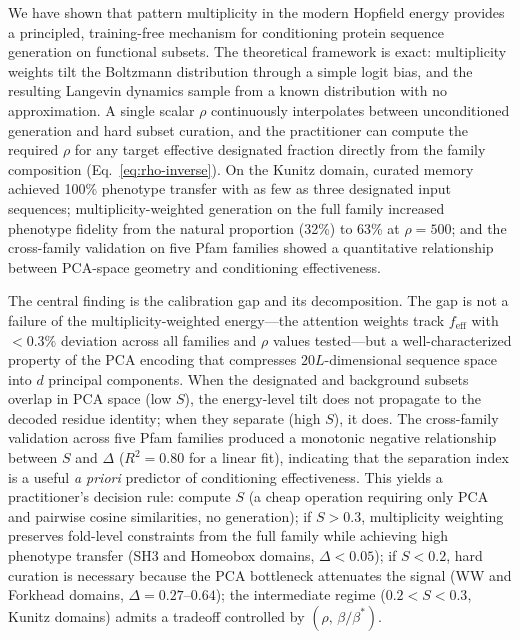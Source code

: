 We have shown that pattern multiplicity in the modern Hopfield energy provides a principled,
training-free mechanism for conditioning protein sequence generation on functional subsets. The
theoretical framework is exact: multiplicity weights tilt the Boltzmann distribution through a
simple logit bias, and the resulting Langevin dynamics sample from a known distribution with no
approximation. A single scalar $\rho$ continuously interpolates between unconditioned generation
and hard subset curation, and the practitioner can compute the required $\rho$ for any target
effective designated fraction directly from the family composition (Eq.~\ref{eq:rho-inverse}). On
the Kunitz domain, curated memory achieved 100\% phenotype transfer with as few as three
designated input sequences; multiplicity-weighted generation on the full family increased
phenotype fidelity from the natural proportion (32\%) to 63\% at $\rho = 500$; and the
cross-family validation on five Pfam families showed a quantitative relationship between
PCA-space geometry and conditioning effectiveness.

The central finding is the calibration gap and its decomposition. The gap is not a
failure of the multiplicity-weighted energy---the attention weights track $f_{\mathrm{eff}}$ with
$< 0.3\%$ deviation across all families and $\rho$ values tested---but a well-characterized
property of the PCA encoding that compresses $20L$-dimensional sequence space into $d$ principal
components. When the designated and background subsets overlap in PCA space (low $S$), the
energy-level tilt does not propagate to the decoded residue identity; when they separate
(high $S$), it does. The cross-family validation across five Pfam families produced a monotonic
negative relationship between $S$ and $\Delta$ ($R^{2} = 0.80$ for a linear fit), indicating
that the separation index is a useful \emph{a priori} predictor of conditioning effectiveness.
This yields a practitioner's decision rule: compute $S$ (a cheap operation requiring only PCA and
pairwise cosine similarities, no generation); if $S > 0.3$, multiplicity weighting preserves
fold-level constraints from the full family while achieving high phenotype transfer (SH3 and
Homeobox domains, $\Delta < 0.05$); if $S < 0.2$, hard curation is necessary because the PCA
bottleneck attenuates the signal (WW and Forkhead domains, $\Delta = 0.27$--$0.64$); the
intermediate regime ($0.2 < S < 0.3$, Kunitz domains) admits a tradeoff controlled by
$(\rho,\, \beta/\beta^{*})$.

